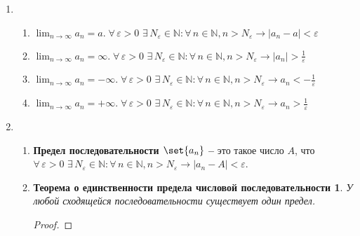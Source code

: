 \documentclass{article}
\theoremstyle{plain}
\begin{document}
\begin{enumerate}
\begin{enumerate}
    \end{enumerate}
    \item \begin{enumerate}
        \item $\lim_{n \to \infty}{a_n} = a.\;\forall\,\varepsilon > 0\,\, \exists\,N_{\varepsilon}\in \mathbb{N}: \forall\, n \in \mathbb{N}, n > N_{\varepsilon} \rightarrow |a_{n} - a| < \varepsilon$
        \item $\lim_{n \to \infty}{a_n} = \infty.\; \forall\,\varepsilon > 0\,\, \exists\,N_{\varepsilon}\in \mathbb{N}: \forall\, n \in \mathbb{N}, n > N_{\varepsilon} \rightarrow |a_{n}| > \frac{1}{\varepsilon}$
        \item $\lim_{n \to \infty}{a_n} = -\infty.\; \forall\,\varepsilon > 0\,\, \exists\,N_{\varepsilon}\in \mathbb{N}: \forall\, n \in \mathbb{N}, n > N_{\varepsilon} \rightarrow a_{n} < -\frac{1}{\varepsilon}$
        \item $\lim_{n \to \infty}{a_n} = +\infty.\; \forall\,\varepsilon > 0\,\, \exists\,N_{\varepsilon}\in \mathbb{N}: \forall\, n \in \mathbb{N}, n > N_{\varepsilon} \rightarrow a_{n} > \frac{1}{\varepsilon}$
    \end{enumerate}
    \item \begin{enumerate}
        \item \textbf{Предел последовательности $\set{{a_{n}}}$ -- } это такое число $A$, что $\forall\,\varepsilon > 0\,\, \exists\,N_{\varepsilon}\in \mathbb{N}: \forall\, n \in \mathbb{N}, n > N_{\varepsilon} \rightarrow |a_{n} - A| < \varepsilon$.
        \item \newtheorem*{theorem5*}{Теорема о единственности предела числовой последовательности}
        \begin{theorem5*}
        У любой сходящейся последовательности существует один предел.
         \end{theorem5*}
         \begin{proof}
         

\end{proof}
\end{enumerate}
\end{enumerate}
\end{document}
